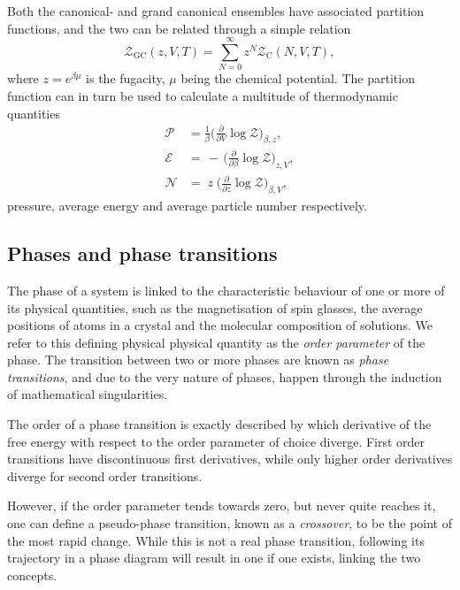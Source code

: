 Both the canonical- and grand canonical ensembles have associated partition
functions, and the two can be related through a simple relation
%
\begin{equation}
  \mathcal{Z}_{\text{GC}}(z, V, T) = \sum_{N=0}^{\infty} z^N \mathcal{Z}_{\text{C}}(N, V, T),
\end{equation}
%
where $z = e^{\beta \mu}$ is the fugacity, $\mu$ being the chemical
potential. The partition function can in turn be used to calculate a multitude
of thermodynamic quantities
%
\begin{align}
  \mathcal{P} &= \frac{1}{\beta} \bigg( \frac{\partial}{\partial V} \log \mathcal{Z}
    \bigg)_{\beta,z}, \\
  \mathcal{E} &= \,\minus\, \bigg( \frac{\partial}{\partial \beta}
    \log \mathcal{Z} \bigg)_{z,V}, \\
  \mathcal{N} &= \;z\; \bigg( \frac{\partial}{\partial z}
    \log \mathcal{Z} \bigg)_{\beta,V},
\end{align}
%
pressure, average energy and average particle number respectively.

\subsection{Phases and phase transitions}

The phase of a system is linked to the characteristic behaviour of one or more
of its physical quantities, such as the magnetisation of spin glasses, the
average positions of atoms in a crystal and the molecular composition of
solutions. We refer to this defining physical physical quantity as the
\emph{order parameter} of the phase.  The transition between two or more phases
are known as \emph{phase transitions}, and due to the very nature of phases,
happen through the induction of mathematical singularities. 

The order of a phase transition is exactly described by which derivative of the
free energy with respect to the order parameter of choice diverge. First order
transitions have discontinuous first derivatives, while only higher order
derivatives diverge for second order transitions.

However, if the order parameter tends towards zero, but never quite reaches it,
one can define a pseudo-phase transition, known as a \emph{crossover}, to be the
point of the most rapid change. While this is not a real phase transition,
following its trajectory in a phase diagram will result in one if one exists,
linking the two concepts.

